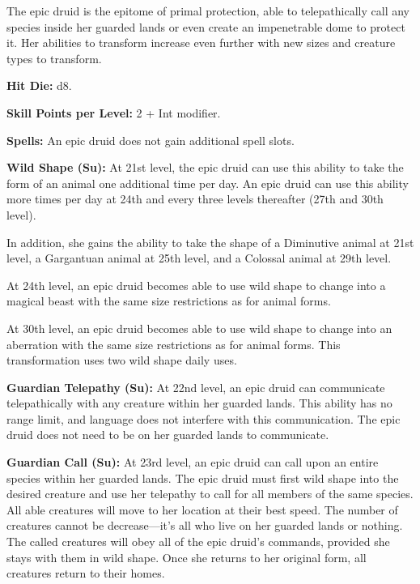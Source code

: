 The epic druid is the epitome of primal protection, able to telepathically call any species inside her guarded lands or even create an impenetrable dome to protect it. Her abilities to transform increase even further with new sizes and creature types to transform.

\textbf{Hit Die:} d8.

\textbf{Skill Points per Level:} 2 + Int modifier.

\textbf{Spells:} An epic druid does not gain additional spell slots. %

\textbf{Wild Shape (Su):} At 21st level, the epic druid can use this ability to take the form of an animal one additional time per day. An epic druid can use this ability more times per day at 24th and every three levels thereafter (27th and 30th level).

In addition, she gains the ability to take the shape of a Diminutive animal at 21st level, a Gargantuan animal at 25th level, and a Colossal animal at 29th level.

At 24th level, an epic druid becomes able to use wild shape to change into a magical beast with the same size restrictions as for animal forms.

At 30th level, an epic druid becomes able to use wild shape to change into an aberration with the same size restrictions as for animal forms. This transformation uses two wild shape daily uses.

\textbf{Guardian Telepathy (Su):} At 22nd level, an epic druid can communicate telepathically with any creature within her guarded lands. This ability has no range limit, and language does not interfere with this communication. The epic druid does not need to be on her guarded lands to communicate.

\textbf{Guardian Call (Su):} At 23rd level, an epic druid can call upon an entire species within her guarded lands. The epic druid must first wild shape into the desired creature and use her telepathy to call for all members of the same species. All able creatures will move to her location at their best speed. The number of creatures cannot be decrease---it's all who live on her guarded lands or nothing. The called creatures will obey all of the epic druid's commands, provided she stays with them in wild shape. Once she returns to her original form, all creatures return to their homes.

